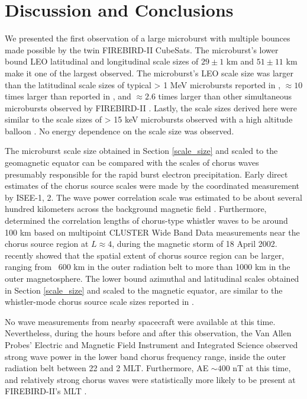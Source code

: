 \documentclass[draft, linenumbers]{agujournal}
\begin{document}
\section{Discussion and Conclusions} \label{discussion}
We presented the first observation of a large microburst with multiple bounces made possible by the twin FIREBIRD-II CubeSats. The microburst's lower bound LEO latitudinal and longitudinal scale sizes of $29 \pm 1$ km and $ 51 \pm 11$ km make it one of the largest observed. The microburst's LEO scale size was larger than the latitudinal scale sizes of typical > 1 MeV microbursts reported in \citet{Blake1996}, $\approx 10$ times larger than reported in \citet{Dietrich2010}, and $\approx 2.6$ times larger than other simultaneous microbursts observed by FIREBIRD-II \citep{Crew2016}. Lastly, the scale sizes derived here were similar to the scale sizes of > 15 keV microbursts observed with a high altitude balloon \citep{Parks1967}. No energy dependence on the scale size was observed.

The microburst scale size obtained in Section \ref{scale_size} and scaled to the geomagnetic equator can be compared with the scales of chorus waves presumably responsible for the rapid burst electron precipitation. Early direct estimates of the chorus source scales were made by the coordinated measurement by ISEE-1, 2. The wave power correlation scale was estimated to be about several hundred kilometers across the background magnetic field \citep{Gurnett1979}. Furthermore, \citet{Santolik2003} determined the correlation lengths of chorus-type whistler waves to be around 100 km based on multipoint CLUSTER Wide Band Data measurements near the chorus source region at $L \approx 4$, during the magnetic storm of 18 April 2002. \citet{Agapitov2010, Agapitov2011b, Agapitov2017a} recently showed that the spatial extent of chorus source region can be larger, ranging from ~600 km in the outer radiation belt to more than 1000 km in the outer magnetosphere. The lower bound azimuthal and latitudinal scales obtained in Section \ref{scale_size} and scaled to the magnetic equator, are similar to the whistler-mode chorus source scale sizes reported in \citet{Agapitov2011b, Agapitov2017a}. 

No wave measurements from nearby spacecraft were available at this time. Nevertheless, during the hours before and after this observation, the Van Allen Probes' \citep{Mauk2013} Electric and Magnetic Field Instrument and Integrated Science \citep{Kletzing2013} observed strong wave power in the lower band chorus frequency range, inside the outer radiation belt between 22 and 2 MLT. Furthermore, AE $\sim 400$ nT at this time, and relatively strong chorus waves were statistically more likely to be present at FIREBIRD-II's MLT \citep{Li2009}.
\end{document}
